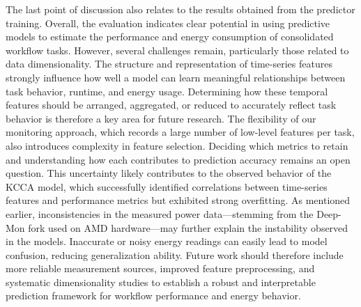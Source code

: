 The last point of discussion also relates to the results obtained from the predictor training. Overall, the evaluation indicates clear potential in using predictive models to estimate the performance and energy consumption of consolidated workflow tasks. However, several challenges remain, particularly those related to data dimensionality. The structure and representation of time-series features strongly influence how well a model can learn meaningful relationships between task behavior, runtime, and energy usage. Determining how these temporal features should be arranged, aggregated, or reduced to accurately reflect task behavior is therefore a key area for future research.
The flexibility of our monitoring approach, which records a large number of low-level features per task, also introduces complexity in feature selection. Deciding which metrics to retain and understanding how each contributes to prediction accuracy remains an open question. This uncertainty likely contributes to the observed behavior of the KCCA model, which successfully identified correlations between time-series features and performance metrics but exhibited strong overfitting.
As mentioned earlier, inconsistencies in the measured power data—stemming from the Deep-Mon fork used on AMD hardware—may further explain the instability observed in the models. Inaccurate or noisy energy readings can easily lead to model confusion, reducing generalization ability. Future work should therefore include more reliable measurement sources, improved feature preprocessing, and systematic dimensionality studies to establish a robust and interpretable prediction framework for workflow performance and energy behavior.

